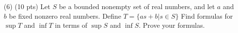 \documentclass[12pt]{amsart}
\theoremstyle{definition}
\theoremstyle{remark}
\begin{document}
\begin{CJK}{UTF8}{bkai}
\begin{enumerate}
\vfill
\bigskip

\item[(6)]  (10 pts)  
Let $S$ be a bounded nonempty set of real numbers, and let $a$ and $b$
be fixed  nonzero real numbers. Define $T=\{as+b| s\in S\}$ Find formulas
for
$\sup T$ and $\inf T$ in terms of $\sup S$ and $\inf S$. Prove your
formulas.



\end{enumerate}



\end{CJK}
\end{document}
